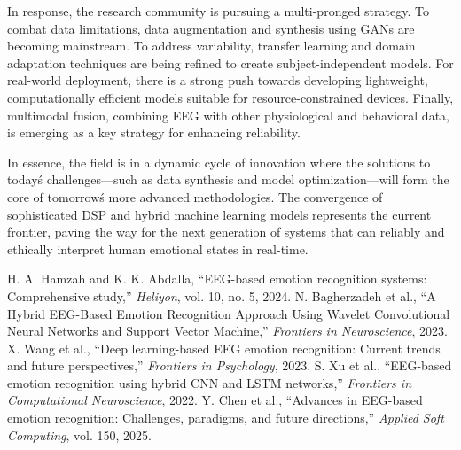 \documentclass[conference]{IEEEtran}
\begin{document}
In response, the research community is pursuing a multi-pronged strategy. To combat data limitations, data augmentation and synthesis using GANs are becoming mainstream. To address variability, transfer learning and domain adaptation techniques are being refined to create subject-independent models. For real-world deployment, there is a strong push towards developing lightweight, computationally efficient models suitable for resource-constrained devices. Finally, multimodal fusion, combining EEG with other physiological and behavioral data, is emerging as a key strategy for enhancing reliability.

In essence, the field is in a dynamic cycle of innovation where the solutions to today\'s challenges—such as data synthesis and model optimization—will form the core of tomorrow\'s more advanced methodologies. The convergence of sophisticated DSP and hybrid machine learning models represents the current frontier, paving the way for the next generation of systems that can reliably and ethically interpret human emotional states in real-time.

\begin{thebibliography}{00}
 H. A. Hamzah and K. K. Abdalla, ``EEG-based emotion recognition systems: Comprehensive study,'' \textit{Heliyon}, vol. 10, no. 5, 2024.
 N. Bagherzadeh et al., ``A Hybrid EEG-Based Emotion Recognition Approach Using Wavelet Convolutional Neural Networks and Support Vector Machine,'' \textit{Frontiers in Neuroscience}, 2023.
 X. Wang et al., ``Deep learning-based EEG emotion recognition: Current trends and future perspectives,'' \textit{Frontiers in Psychology}, 2023.
 S. Xu et al., ``EEG-based emotion recognition using hybrid CNN and LSTM networks,'' \textit{Frontiers in Computational Neuroscience}, 2022.
 Y. Chen et al., ``Advances in EEG-based emotion recognition: Challenges, paradigms, and future directions,'' \textit{Applied Soft Computing}, vol. 150, 2025.
\end{thebibliography}
\end{document}
